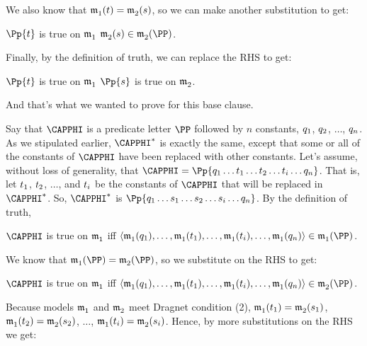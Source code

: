 \begin{PROOF}
\begin{description}
\begin{cenumerate}
We also know that $\mathfrak{m^{\mathrm{}}_{\mathrm{1}}}(t)=\mathfrak{m^{\mathrm{}}_{\mathrm{2}}}(s)$, so we can make another substitution to get:

\begin{center}
	$\Pp{\variable{t}}$ is true on $\mathfrak{m^{\mathrm{}}_{\mathrm{1}}}$ \Iff $\As{}{2}(\variable{s})\in\As{}{2}(\PP)$.
\end{center}

Finally, by the definition of truth, we can replace the RHS to get:

\begin{center}
	$\Pp{\variable{t}}$ is true on $\mathfrak{m^{\mathrm{}}_{\mathrm{1}}}$ \Iff $\Pp{\variable{s}}$ is true on $\mathfrak{m^{\mathrm{}}_{\mathrm{2}}}$.
\end{center}

And that's what we wanted to prove for this base clause.

\item Say that $\CAPPHI$ is a predicate letter $\PP$ followed by $n$ constants,  $q_{1}$, $q_{2}$, $\ldots$, $q_{n}$.  As we stipulated earlier, $\CAPPHI^*$ is exactly the same, except that some or all of the constants of $\CAPPHI$ have been replaced with other constants.  Let's assume, without loss of generality, that $\CAPPHI=\Pp{\variable{q}_{\integer{1}}\ldots\variable{t}_1\ldots\variable{t}_2\ldots\variable{t}_{\integer{i}}\ldots\variable{q}_{\integer{n}}}$.  That is, let $t_1$, $t_2$, $\ldots $, and $t_i$ be the constants of $\CAPPHI$ that will be replaced in $\CAPPHI^*$.  So, $\CAPPHI^*$ is $\Pp{\variable{q}_{\integer{1}}\ldots\variable{s}_1\ldots\variable{s}_2\ldots\variable{s}_{\integer{i}}\ldots\variable{q}_{\integer{n}}}$. By the definition of truth, 
\begin{center}
$\CAPPHI$ is true on $\mathfrak{m^{\mathrm{}}_{\mathrm{1}}}$ iff $\langle\As{}{1}(\variable{q}_{\integer{1}}),\ldots,\As{}{1}(\variable{t}_1),\ldots,\As{}{1}(\variable{t}_{\integer{i}}),\ldots,\As{}{1}(\variable{q}_{\integer{n}})\rangle\in\As{}{1}(\PP)$.
\end{center}
We know that $\As{}{1}(\PP)=\As{}{2}(\PP)$, so we substitute on the RHS to get:
\begin{center}
	$\CAPPHI$ is true on $\mathfrak{m^{\mathrm{}}_{\mathrm{1}}}$ iff $\langle\As{}{1}(\variable{q}_{\integer{1}}),\ldots,\As{}{1}(\variable{t}_1),\ldots,\As{}{1}(\variable{t}_{\integer{i}}),\ldots,\As{}{1}(\variable{q}_{\integer{n}})\rangle\in\As{}{2}(\PP)$.
\end{center}
Because models $\mathfrak{m^{\mathrm{}}_{\mathrm{1}}}$ and $\mathfrak{m^{\mathrm{}}_{\mathrm{2}}}$ meet Dragnet condition (2),  $\mathfrak{m^{\mathrm{}}_{\mathrm{1}}}(t_1)=\mathfrak{m^{\mathrm{}}_{\mathrm{2}}}(s_1)$, $\mathfrak{m^{\mathrm{}}_{\mathrm{1}}}(t_2)=\mathfrak{m^{\mathrm{}}_{\mathrm{2}}}(s_2)$, $\ldots$, $\mathfrak{m^{\mathrm{}}_{\mathrm{1}}}(t_{i})=\mathfrak{m^{\mathrm{}}_{\mathrm{2}}}(s_{i})$. Hence, by more substitutions on the RHS we get:

\end{cenumerate}
\end{description}
\end{PROOF}
